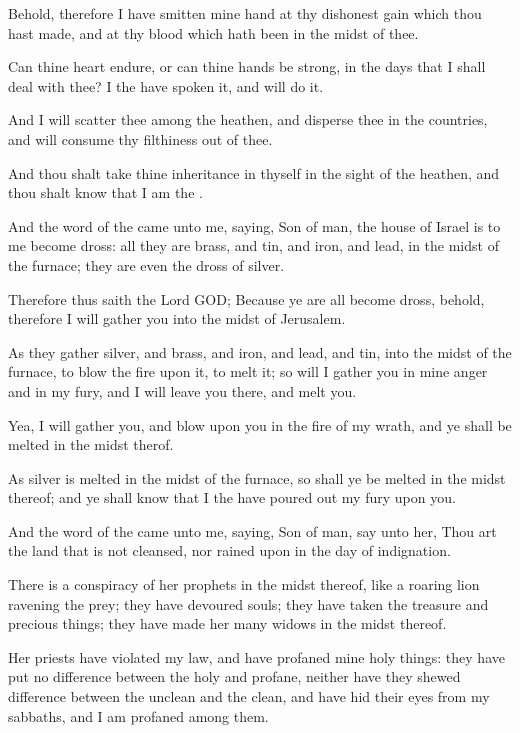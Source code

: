 \verse Behold, therefore I have smitten mine hand at thy dishonest gain which thou hast made, and at thy blood which hath been in the midst of thee.

\verse Can thine heart endure, or can thine hands be strong, in the days that I shall deal with thee? I the \LORD have spoken it, and will do it.

\verse And I will scatter thee among the heathen, and disperse thee in the countries, and will consume thy filthiness out of thee.

\verse And thou shalt take thine inheritance in thyself in the sight of the heathen, and thou shalt know that I am the \LORD.

\verse And the word of the \LORD came unto me, saying, \verse Son of man, the house of Israel is to me become dross: all they are brass, and tin, and iron, and lead, in the midst of the furnace; they are even the dross of silver.

\verse Therefore thus saith the Lord GOD; Because ye are all become dross, behold, therefore I will gather you into the midst of Jerusalem.

\verse As they gather silver, and brass, and iron, and lead, and tin, into the midst of the furnace, to blow the fire upon it, to melt it; so will I gather you in mine anger and in my fury, and I will leave you there, and melt you.

\verse Yea, I will gather you, and blow upon you in the fire of my wrath, and ye shall be melted in the midst therof.

\verse As silver is melted in the midst of the furnace, so shall ye be melted in the midst thereof; and ye shall know that I the \LORD have poured out my fury upon you.

\verse And the word of the \LORD came unto me, saying, \verse Son of man, say unto her, Thou art the land that is not cleansed, nor rained upon in the day of indignation.

\verse There is a conspiracy of her prophets in the midst thereof, like a roaring lion ravening the prey; they have devoured souls; they have taken the treasure and precious things; they have made her many widows in the midst thereof.

\verse Her priests have violated my law, and have profaned mine holy things: they have put no difference between the holy and profane, neither have they shewed difference between the unclean and the clean, and have hid their eyes from my sabbaths, and I am profaned among them.

